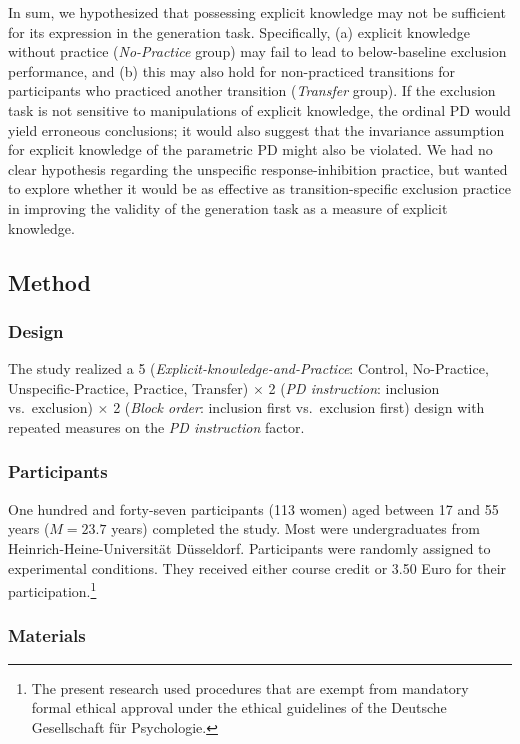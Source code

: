 \documentclass[floatsintext,doc]{apa6}
\theoremstyle{definition}
\theoremstyle{definition}
\theoremstyle{definition}
\theoremstyle{remark}
\begin{document}
In sum, we hypothesized that possessing explicit knowledge may not be
sufficient for its expression in the generation task. Specifically, (a)
explicit knowledge without practice (\emph{No-Practice} group) may fail
to lead to below-baseline exclusion performance, and (b) this may also
hold for non-practiced transitions for participants who practiced
another transition (\emph{Transfer} group). If the exclusion task is not
sensitive to manipulations of explicit knowledge, the ordinal PD would
yield erroneous conclusions; it would also suggest that the invariance
assumption for explicit knowledge of the parametric PD might also be
violated. We had no clear hypothesis regarding the unspecific
response-inhibition practice, but wanted to explore whether it would be
as effective as transition-specific exclusion practice in improving the
validity of the generation task as a measure of explicit knowledge.

\subsection{Method}\label{method}

\subsubsection{Design}\label{design}

The study realized a 5 (\emph{Explicit-knowledge-and-Practice}: Control,
No-Practice, Unspecific-Practice, Practice, Transfer) \(\times\) 2
(\emph{PD instruction}: inclusion vs.~exclusion) \(\times\) 2
(\emph{Block order}: inclusion first vs.~exclusion first) design with
repeated measures on the \emph{PD instruction} factor.

\subsubsection{Participants}\label{participants}

One hundred and forty-seven participants (113 women) aged between 17 and
55 years (\(M = 23.7\) years) completed the study. Most were
undergraduates from Heinrich-Heine-Universität Düsseldorf. Participants
were randomly assigned to experimental conditions. They received either
course credit or 3.50 Euro for their participation.\footnote{The present
  research used procedures that are exempt from mandatory formal ethical
  approval under the ethical guidelines of the Deutsche Gesellschaft für
  Psychologie.}

\subsubsection{Materials}\label{materials}
\end{document}
